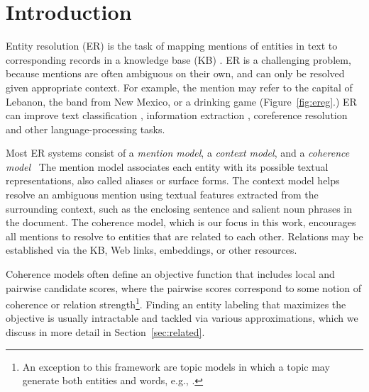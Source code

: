 \section{Introduction}
\label{sec:intro}

Entity resolution (ER) is the task of mapping mentions of entities in
text to corresponding records in a knowledge base (KB)
\cite{BunescuP06,Cucerzan07,KulkarniSRC09,Dredze2010,Hoffart2011,Hachey2013130}.
ER is a challenging problem, because mentions are often ambiguous on
their own, and can only be resolved given appropriate context.  For
example, the mention  may refer to the capital of
Lebanon, the band from New Mexico, or a drinking game
(Figure~\ref{fig:ereg}.)
ER can improve text classification \cite{Gabrilovich2007}, information
extraction \cite{Lin2012}, coreference resolution
\cite{finin2009Coreference,mayfield2009cross} and other
language-processing tasks.

Most ER systems consist of a \emph{mention model}, a \emph{context
  model}, and a \emph{coherence
  model}~\cite{Milne2008,Cucerzan07,Ratinov11,Hoffart2011,Hachey2013130}
The mention model associates each entity with its possible textual
representations, also called aliases or surface forms.  The context
model helps resolve an ambiguous mention using textual features
extracted from the surrounding context, such as the enclosing sentence
and salient noun phrases in the document. The coherence model, which
is our focus in this work, encourages all mentions to resolve to
entities that are related to each other.  Relations may be established
via the KB, Web links, embeddings, or other resources.

Coherence models often define an objective function that includes
local and pairwise candidate scores, where the pairwise scores
correspond to some notion of coherence or relation
strength\footnote{An exception to this framework are topic models in
  which a topic may generate both entities and words, e.g.,
  \cite{kataria2011,HanS12,houlsby2014scalable}.}. Finding an entity
labeling that maximizes the objective is usually intractable and
tackled via various approximations, which we discuss in more detail in
Section~\ref{sec:related}.

